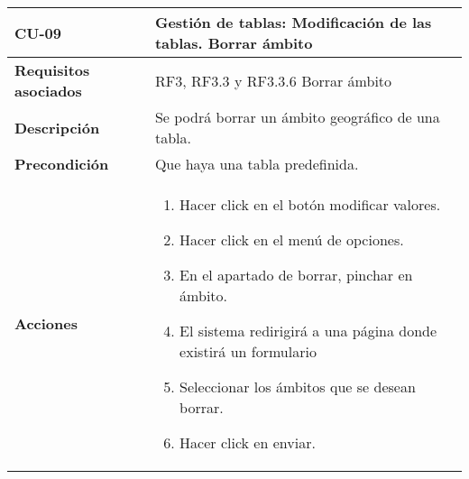 \newpage
\begin{longtable}[H]{@{}ll@{}}
\toprule
\begin{minipage}[b]{0.23\columnwidth}\raggedright\strut
\textbf{CU-09}\strut
\end{minipage} & \begin{minipage}[b]{0.71\columnwidth}\raggedright\strut
\textbf{Gestión de tablas: Modificación de las tablas. Borrar ámbito}\strut
\end{minipage}\tabularnewline
\midrule
\endhead
\begin{minipage}[t]{0.23\columnwidth}\raggedright\strut
\textbf{Requisitos asociados}\strut
\end{minipage} & \begin{minipage}[t]{0.71\columnwidth}\raggedright\strut
RF3, RF3.3 y RF3.3.6 Borrar ámbito\strut
\end{minipage}\tabularnewline
\begin{minipage}[t]{0.23\columnwidth}\raggedright\strut
\textbf{Descripción}\strut
\end{minipage} & \begin{minipage}[t]{0.71\columnwidth}\raggedright\strut
Se podrá borrar un ámbito geográfico de una tabla.
\strut
\end{minipage}\tabularnewline
\begin{minipage}[t]{0.23\columnwidth}\raggedright\strut
\textbf{Precondición}\strut
\end{minipage} & \begin{minipage}[t]{0.71\columnwidth}\raggedright\strut
Que haya una tabla predefinida.\strut
\end{minipage}\tabularnewline
\begin{minipage}[t]{0.23\columnwidth}\raggedright\strut
\textbf{Acciones}\strut
\end{minipage} & \begin{minipage}[t]{0.71\columnwidth}\raggedright\strut
\begin{enumerate}
\def\labelenumi{\arabic{enumi}.}
\tightlist
\item
Hacer click en el botón modificar valores.
\item
Hacer click en el menú de opciones.
\item
En el apartado de borrar, pinchar en ámbito.
\item
El sistema redirigirá a una página donde existirá un formulario
\item 
Seleccionar los ámbitos que se desean borrar.
\item
Hacer click en enviar.

\end{enumerate}
\end{minipage}
\end{longtable}

